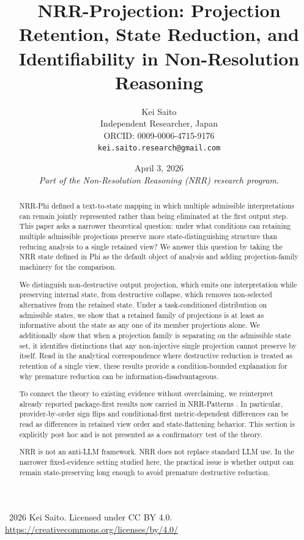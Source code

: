 \documentclass[11pt,a4paper]{article}
\title{\textbf{NRR-Projection: Projection Retention, State Reduction, and Identifiability in Non-Resolution Reasoning}}
\author{
  Kei Saito \\
  Independent Researcher, Japan \\
  ORCID: 0009-0006-4715-9176 \\
  \texttt{kei.saito.research@gmail.com}
}
\date{April 3, 2026 \\[0.5em]
\textit{Part of the Non-Resolution Reasoning (NRR) research program.}}
\begin{document}
\maketitle

\begin{center}
\textcopyright\ 2026 Kei Saito.
Licensed under CC BY 4.0.\\
\url{https://creativecommons.org/licenses/by/4.0/}
\end{center}

\begin{abstract}
NRR-Phi \cite{saito2026phi} defined a text-to-state mapping in which multiple admissible interpretations can remain jointly represented rather than being eliminated at the first output step. This paper asks a narrower theoretical question: under what conditions can retaining multiple admissible projections preserve more state-distinguishing structure than reducing analysis to a single retained view? We answer this question by taking the NRR state defined in Phi as the default object of analysis and adding projection-family machinery for the comparison.

We distinguish non-destructive output projection, which emits one interpretation while preserving internal state, from destructive collapse, which removes non-selected alternatives from the retained state. Under a task-conditioned distribution on admissible states, we show that a retained family of projections is at least as informative about the state as any one of its member projections alone. We additionally show that when a projection family is separating on the admissible state set, it identifies distinctions that any non-injective single projection cannot preserve by itself. Read in the analytical correspondence where destructive reduction is treated as retention of a single view, these results provide a condition-bounded explanation for why premature reduction can be information-disadvantageous.

To connect the theory to existing evidence without overclaiming, we reinterpret already reported package-first results now carried in NRR-Patterns \cite{saito2026patterns}. In particular, provider-by-order sign flips and conditional-first metric-dependent differences can be read as differences in retained view order and state-flattening behavior. This section is explicitly post hoc and is not presented as a confirmatory test of the theory.

NRR is not an anti-LLM framework. NRR does not replace standard LLM use. In the narrower fixed-evidence setting studied here, the practical issue is whether output can remain state-preserving long enough to avoid premature destructive reduction.
\end{abstract}
\end{document}
